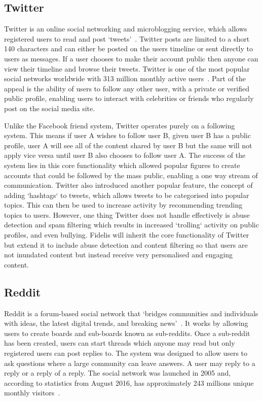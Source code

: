 \subsection{Twitter}
Twitter is an online social networking and microblogging service, which allows registered users to read and post `tweets'~\cite{Statista:Twitter}. Twitter posts are limited to a short 140 characters and can either be posted on the users timeline or sent directly to users as messages. If a user chooses to make their account public then anyone can view their timeline and browse their tweets. Twitter is one of the most popular social networks worldwide with 313 million monthly active users~\cite{Statista:Twitter, Twitter:About}. Part of the appeal is the ability of users to follow any other user, with a private or verified public profile, enabling users to interact with celebrities or friends who regularly post on the social media site.

Unlike the Facebook friend system, Twitter operates purely on a following system. This means if user A wishes to follow user B, given user B has a public profile, user A will see all of the content shared by user B but the same will not apply vice versa until user B also chooses to follow user A. The success of the system lies in this core functionality which allowed popular figures to create accounts that could be followed by the mass public, enabling a one way stream of communication. Twitter also introduced another popular feature, the concept of adding `hashtags` to tweets, which allows tweets to be categorised into popular topics. This can then be used to increase activity by recommending trending topics to users. However, one thing Twitter does not handle effectively is abuse detection and spam filtering which results in increased `trolling` activity on public profiles, and even bullying. Fidelis will inherit the core functionality of Twitter but extend it to include abuse detection and content filtering so that users are not inundated content but instead receive very personalised and engaging content.

\subsection{Reddit}
Reddit is a forum-based social network that `bridges communities and individuals with ideas, the latest digital trends, and breaking news'~\cite{Reddit:About}. It works by allowing users to create boards and sub-boards known as sub-reddits. Once a sub-reddit has been created, users can start threads which anyone may read but only registered users can post replies to. The system was designed to allow users to ask questions where a large community can leave answers. A user may reply to a reply or a reply of a reply. The social network was launched in 2005 and, according to statistics from August 2016, has approximately 243 millions unique monthly visitors~\cite{Statista:Reddit}.

